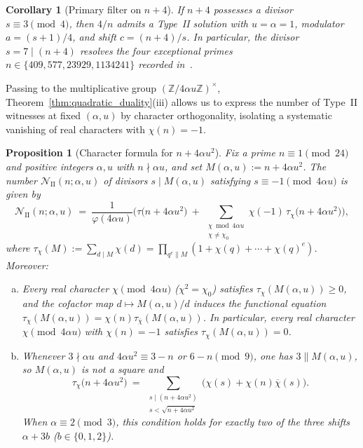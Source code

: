 \documentclass[11pt, a4paper]{article}
\theoremstyle{plain}
\newtheorem{corollary}[theorem]{Corollary}
\newtheorem{proposition}[theorem]{Proposition}
\theoremstyle{definition}
\newcommand{\Z}{\mathbb{Z}}
\begin{document}
\begin{corollary}[Primary filter on $n+4$]\label{cor:filter_n_plus_4}
If $n+4$ possesses a divisor $s\equiv3\pmod 4$, then $4/n$ admits a Type~II solution with $u=\alpha=1$, modulator $a=(s+1)/4$, and shift $c=(n+4)/s$. In particular, the divisor $s=7\mid(n+4)$ resolves the four exceptional primes $n\in\{409,577,23929,1134241\}$ recorded in~\cite[Prop.~3.7]{dahan2026a}.
\end{corollary}

Passing to the multiplicative group $(\Z/4\alpha u\Z)^{\times}$, Theorem~\ref{thm:quadratic_duality}(iii) allows us to express the number of Type~II witnesses at fixed $(\alpha,u)$ by character orthogonality, isolating a systematic vanishing of real characters with $\chi(n)=-1$.

\begin{proposition}[Character formula for $n+4\alpha u^{2}$]\label{thm:character_counting_n_plus_4au2}
Fix a prime $n\equiv1\pmod{24}$ and positive integers $\alpha,u$ with $n\nmid\alpha u$, and set $M(\alpha,u):=n+4\alpha u^{2}$. The number $\mathcal{N}_{\mathrm{II}}(n;\alpha,u)$ of divisors $s\mid M(\alpha,u)$ satisfying $s\equiv-1\pmod{4\alpha u}$ is given by
\begin{equation}\label{eq:dirichlet_hyperbola_exact}
\mathcal{N}_{\mathrm{II}}(n;\alpha,u)\ =\ \frac{1}{\varphi(4\alpha u)}\bigg(\tau\big(n+4\alpha u^{2}\big)\ +\ \sum_{\substack{\chi\bmod 4\alpha u\\ \chi\neq\chi_0}}\chi(-1)\,\tau_\chi\big(n+4\alpha u^{2}\big)\bigg),
\end{equation}
where $\tau_\chi(M):=\sum_{d\mid M}\chi(d)=\prod_{q^{e}\parallel M}(1+\chi(q)+\cdots+\chi(q)^{e})$. Moreover:
\begin{enumerate}[(a)]
    \item Every real character $\chi\pmod{4\alpha u}$ ($\chi^{2}=\chi_0$) satisfies $\tau_\chi(M(\alpha,u))\ge0$, and the cofactor map $d\mapsto M(\alpha,u)/d$ induces the functional equation $\tau_\chi(M(\alpha,u))=\chi(n)\tau_{\overline{\chi}}(M(\alpha,u))$. In particular, every real character $\chi\pmod{4\alpha u}$ with $\chi(n)=-1$ satisfies $\tau_\chi(M(\alpha,u))=0$.
    \item Whenever $3\nmid\alpha u$ and $4\alpha u^{2}\equiv 3-n$ or $6-n\pmod 9$, one has $3\parallel M(\alpha,u)$, so $M(\alpha,u)$ is not a square and
    $$\tau_\chi\big(n+4\alpha u^{2}\big)\ =\ \sum_{\substack{s\mid(n+4\alpha u^{2})\\ s<\sqrt{n+4\alpha u^{2}}}}\big(\chi(s)+\chi(n)\overline{\chi}(s)\big).$$
    When $\alpha\equiv2\pmod 3$, this condition holds for exactly two of the three shifts $\alpha+3b$ ($b\in\{0,1,2\}$).
\end{enumerate}
\end{proposition}
\end{document}
